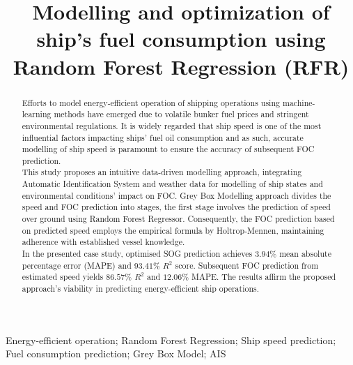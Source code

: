 \documentclass[]{interact}
\theoremstyle{plain}%
\theoremstyle{definition}
\theoremstyle{remark}
\begin{document}

\title{Modelling and optimization of ship's fuel consumption using Random Forest Regression (RFR)}

\author{
}

\maketitle

\begin{abstract}
Efforts to model energy-efficient operation of shipping operations using machine-learning methods have emerged due to volatile bunker fuel prices and stringent environmental regulations. It is widely regarded that ship speed is one of the most influential factors impacting ships' fuel oil consumption and as such, accurate modelling of ship speed is paramount to ensure the accuracy of subsequent FOC prediction.\\

This study proposes an intuitive data-driven modelling approach, integrating Automatic Identification System and weather data for modelling of ship states and environmental conditions' impact on FOC. Grey Box Modelling approach divides the speed and FOC prediction into stages, the first stage involves the prediction of speed over ground using Random Forest Regressor. Consequently, the FOC prediction based on predicted speed employs the empirical formula by Holtrop-Mennen, maintaining adherence with established vessel knowledge.\\
  
In the presented case study, optimised SOG prediction achieves $3.94\%$ mean absolute percentage error (MAPE) and $93.41\%$ $R^2$ score. Subsequent FOC prediction from estimated speed yields $86.57\%$ $R^2$ and $12.06\%$ MAPE. The results affirm the proposed approach's viability in predicting energy-efficient ship operations.
\end{abstract}

\begin{keywords}
Energy-efficient operation; Random Forest Regression; Ship speed prediction; Fuel consumption prediction; Grey Box Model; AIS 
\end{keywords}
\end{document}
